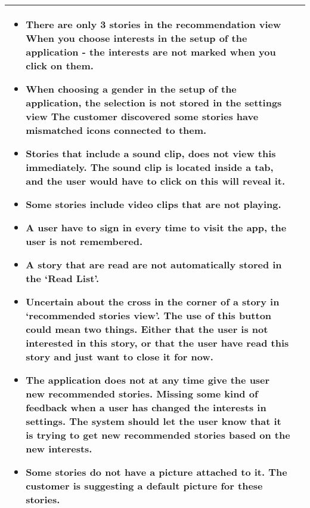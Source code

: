 {{\begin{center}
\begin{longtable}{ | p{4cm} | p{13cm} | }
\begin{itemize}[noitemsep]
		 \item There are only 3 stories in the recommendation view 
		 When you choose interests in the setup of the application - the interests are not marked when you click on them. \newline
		 \item When choosing a gender in the setup of the application, the selection is not stored in the settings view
		 The customer discovered some stories have mismatched icons connected to them. \newline
		 \item Stories that include a sound clip, does not view this immediately. The sound clip is located inside a tab, and the user would have to click on this will reveal it. \newline
		\item  Some stories include video clips that are not playing.  \newline
		\item  A user have to sign in every time to visit the app, the user is not remembered. \newline
		\item  A story that are read are not automatically stored in the ‘Read List’. \newline
		\item  Uncertain about the cross in the corner of a story in ‘recommended stories view’. The use of this button could mean two things. Either that the user is not interested in this story, or that the user have read this story and just want to close it for now. \newline
		\item  The application does not at any time give the user new recommended stories. \newline
		 Missing some kind of feedback when a user has changed the interests in settings. The system should let the user know that it is trying to get new recommended stories based on the new interests. \newline
		 \item Some stories do not have a picture attached to it. The customer is suggesting a default picture for these stories.
		 \end{itemize}
		 \\ \hline 
		 

		
	\end{longtable}
\end{center}

}}
